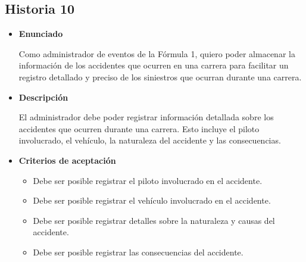 \documentclass{article}
\begin{document}
	\subsection{Historia 10}
	\begin{itemize}
		
		\item \large{\textbf{Enunciado}}
		\begin{description}
		Como administrador de eventos de la Fórmula 1, quiero poder almacenar la información de los accidentes que ocurren en una carrera para facilitar un registro detallado y preciso de los siniestros que ocurran durante una carrera.
		\end{description}
		
		\item \large{\textbf{Descripción}}
		\begin{description}
		El administrador debe poder registrar información detallada sobre los accidentes que ocurren durante una carrera. Esto incluye el piloto involucrado, el vehículo, la naturaleza del accidente y las consecuencias. 

		\end{description}
		
		\item \large{\textbf{Criterios de aceptación}}
		\begin{itemize}
			\item Debe ser posible registrar el piloto involucrado en el accidente.
			\item Debe ser posible registrar el vehículo involucrado en el accidente. 
			\item Debe ser posible registrar detalles sobre la naturaleza y causas del accidente. 
			\item Debe ser posible registrar las consecuencias del accidente.
			
		\end{itemize}
		
	\end{itemize}
	
\end{document}
